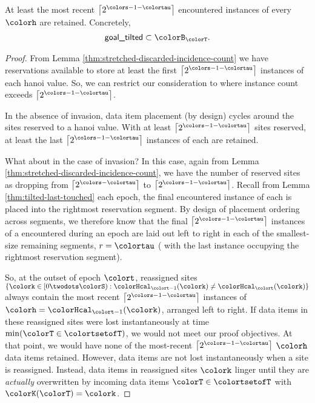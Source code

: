 \begin{lemma}
\label{thm:tilted-most-recent-retained}
At least the most recent $\left\lceil2^{\colors - 1 - \colortau}\right\rceil$ encountered instances of every \hv{} $\colorh$ are retained.
Concretely,
\begin{align*}
\textsf{goal\_tilted} \subset \colorB_{\colorT}.
\end{align*}
\end{lemma}
\begin{proof}
From Lemma \ref{thm:stretched-discarded-incidence-count} we have reservations available to store at least the first $\left\lceil 2^{\colors - 1 - \colortau} \right\rceil$ instances of each hanoi value.
So, we can restrict our consideration to where \hv{} instance count exceeds $\left\lceil 2^{\colors - 1 - \colortau} \right\rceil$.

In the absence of invasion, data item placement (by design) cycles around the sites reserved to a hanoi value.
With at least $\left\lceil 2^{\colors - 1 - \colortau} \right\rceil$ sites reserved, at least the last $\left\lceil 2^{\colors - 1 - \colortau} \right\rceil$ instances of each \hv{} are retained.

What about in the case of invasion?
In this case, again from Lemma \ref{thm:stretched-discarded-incidence-count}, we have the number of reserved sites as dropping from $\left\lceil 2^{\colors - \colortau} \right\rceil$ to $\left\lceil 2^{\colors - 1 - \colortau} \right\rceil$.
Recall from Lemma \ref{thm:tilted-last-touched} each epoch, the final encountered instance of each \hv{} is placed into the rightmost reservation segment.
By design of placement ordering across segments, we therefore know that the final $\left\lceil 2^{\colors - 1 - \colortau} \right\rceil$ instances of a \hv{} encountered during an epoch are laid out left to right in each of the smallest-size remaining segments, $r = \colortau$ ( with the last instance occupying the rightmost reservation segment).

So, at the outset of epoch $\colort$, reassigned sites $\{\colork \in [0\twodots\colorS) : \colorHcal_{\colort - 1}(\colork) \neq \colorHcal_{\colort}(\colork)\}$ always contain the most recent $\left\lceil 2^{\colors - 1 - \colortau} \right\rceil$ instances of \hv{} $\colorh = \colorHcal_{\colort - 1}(\colork)$, arranged left to right.
If data items in these reassigned sites were lost instantaneously at time $\min(\colorT \in \colortsetofT)$, we would not meet our proof objectives.
At that point, we would have none of the most-recent $\left\lceil 2^{\colors - 1 - \colortau} \right\rceil$ \hv{} $\colorh$ data items retained.
However, data items are not lost instantaneously when a site is reassigned.
Instead, data items in reassigned sites $\colork$ linger until they are \textit{actually} overwritten by incoming data items $\colorT \in \colortsetofT$ with $\colorK(\colorT) = \colork$.


\end{proof}
